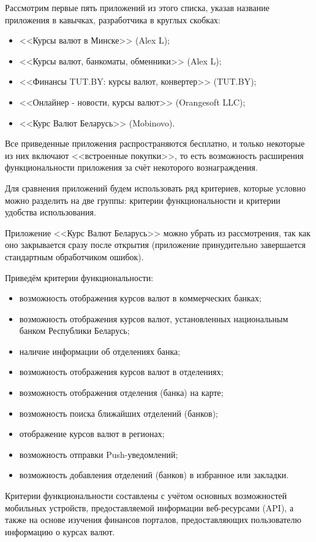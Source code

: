 Рассмотрим первые пять приложений из этого списка, указав название приложения
в кавычках, разработчика в круглых скобках:
\begin{itemize}
  \item <<Курсы валют в Минске>> (Alex L);
  \item <<Курсы валют, банкоматы, обменники>> (Alex L);
  \item <<Финансы TUT.BY: курсы валют, конвертер>> (TUT.BY);
  \item <<Онлайнер - новости, курсы валют>> (Orangesoft LLC);
  \item <<Курс Валют Беларусь>> (Mobinovo).
\end{itemize}

Все приведенные приложения распространяются бесплатно, и только некоторые из
них включают <<встроенные покупки>>, то есть возможность расширения
функциональности приложения за счёт некоторого вознаграждения.

Для сравнения приложений будем использовать ряд критериев, которые условно
можно разделить на две группы: критерии функциональности и критерии удобства
использования.

Приложение <<Курс Валют Беларусь>> можно убрать из рассмотрения, так как оно
закрывается сразу после открытия (приложение принудительно завершается
стандартным обработчиком ошибок).

Приведём критерии функциональности:
\begin{itemize}
  \item возможность отображения курсов валют в коммерческих банках;
  \item возможность отображения курсов валют, установленных национальным
    банком Республики Беларусь;
  \item наличие информации об отделениях банка;
  \item возможность отображения курсов валют в отделениях;
  \item возможность отображения отделения (банка) на карте;
  \item возможность поиска ближайших отделений (банков);
  \item отображение курсов валют в регионах;
  \item возможность отправки Push-уведомлений;
  \item возможность добавления отделений (банков)
    в избранное или закладки.
\end{itemize}

Критерии функциональности составлены с учётом основных возможностей
мобильных устройств, предоставляемой информации веб-ресурсами (API),
а также на основе изучения финансов порталов, предоставляющих пользователю
информацию о курсах валют.


